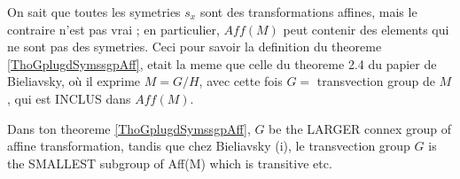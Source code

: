 \begin{enumerate}
On sait que toutes les symetries $s_x$ sont des transformations affines, mais le contraire n’est pas vrai ; en particulier, $Aff(M)$  peut contenir des elements qui ne sont pas des symetries.  Ceci pour savoir la definition du theoreme  \ref{ThoGplugdSymssgpAff}, etait la meme que celle du theoreme 2.4 du papier de Bieliavsky, où il exprime $M=G/H$, avec cette fois $G =$ transvection group de $M$, qui est INCLUS dans $Aff(M)$. 

Dans ton theoreme \ref{ThoGplugdSymssgpAff}, $G$ be the LARGER connex group of affine transformation, tandis que chez Bieliavsky (i), le transvection group $G$ is the SMALLEST subgroup of Aff(M) which is transitive etc.

\end{enumerate}

